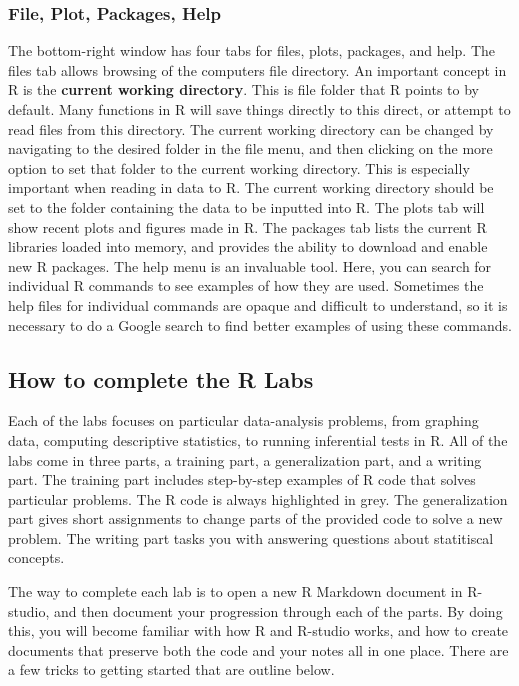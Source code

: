 \documentclass[
]{book}
\begin{document}
\hypertarget{file-plot-packages-help}{%
\subsubsection{File, Plot, Packages, Help}\label{file-plot-packages-help}}

The bottom-right window has four tabs for files, plots, packages, and help. The files tab allows browsing of the computers file directory. An important concept in R is the \textbf{current working directory}. This is file folder that R points to by default. Many functions in R will save things directly to this direct, or attempt to read files from this directory. The current working directory can be changed by navigating to the desired folder in the file menu, and then clicking on the more option to set that folder to the current working directory. This is especially important when reading in data to R. The current working directory should be set to the folder containing the data to be inputted into R. The plots tab will show recent plots and figures made in R. The packages tab lists the current R libraries loaded into memory, and provides the ability to download and enable new R packages. The help menu is an invaluable tool. Here, you can search for individual R commands to see examples of how they are used. Sometimes the help files for individual commands are opaque and difficult to understand, so it is necessary to do a Google search to find better examples of using these commands.

\hypertarget{how-to-complete-the-r-labs}{%
\subsection{How to complete the R Labs}\label{how-to-complete-the-r-labs}}

Each of the labs focuses on particular data-analysis problems, from graphing data, computing descriptive statistics, to running inferential tests in R. All of the labs come in three parts, a training part, a generalization part, and a writing part. The training part includes step-by-step examples of R code that solves particular problems. The R code is always highlighted in grey. The generalization part gives short assignments to change parts of the provided code to solve a new problem. The writing part tasks you with answering questions about statitiscal concepts.

The way to complete each lab is to open a new R Markdown document in R-studio, and then document your progression through each of the parts. By doing this, you will become familiar with how R and R-studio works, and how to create documents that preserve both the code and your notes all in one place. There are a few tricks to getting started that are outline below.
\end{document}
